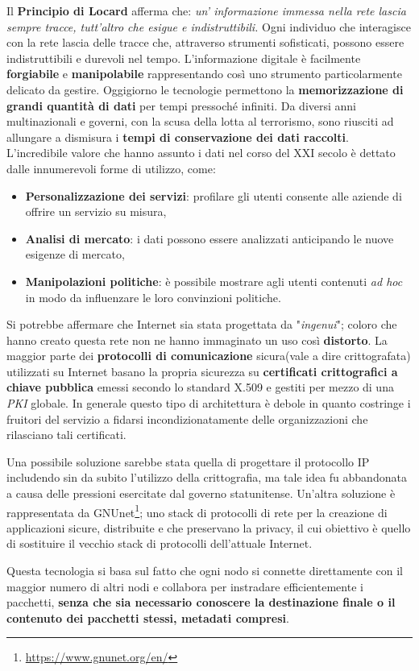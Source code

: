 \bigbreak
Il \textbf{Principio di Locard} afferma che:\emph{ un' informazione immessa nella rete lascia sempre tracce, tutt’altro che esigue e indistruttibili.} Ogni individuo che interagisce con la rete lascia delle tracce che, attraverso strumenti sofisticati, possono essere indistruttibili e durevoli nel tempo. L'informazione digitale è facilmente \textbf{forgiabile} e \textbf{manipolabile} rappresentando così uno strumento particolarmente delicato da gestire. Oggigiorno le tecnologie permettono la \textbf{memorizzazione di grandi quantità di dati} per tempi pressoché infiniti. Da diversi anni multinazionali e governi, con la scusa della lotta al terrorismo, sono riusciti ad allungare a dismisura i \textbf{tempi di conservazione dei dati raccolti}.
\bigbreak
L'incredibile valore che hanno assunto i dati nel corso del XXI secolo è dettato dalle innumerevoli forme di utilizzo, come:
\begin{itemize}
    \item \textbf{Personalizzazione dei servizi}: profilare gli utenti consente alle aziende di offrire un servizio su misura,
    \item \textbf{Analisi di mercato}: i dati possono essere analizzati anticipando le nuove esigenze di mercato,
    \item \textbf{Manipolazioni politiche}: è possibile mostrare agli utenti contenuti \emph{ad hoc} in modo da influenzare le loro convinzioni politiche.
\end{itemize}

\bigbreak
Si potrebbe affermare che Internet sia stata progettata da "\emph{ingenui}"; coloro che hanno creato questa rete non ne hanno immaginato un uso così \textbf{distorto}.
La maggior parte dei \textbf{protocolli di comunicazione} sicura(vale a dire crittografata) utilizzati su Internet basano la propria sicurezza su \textbf{certificati crittografici a chiave pubblica} emessi secondo lo standard X.509 e gestiti per mezzo di una \emph{PKI} globale.
In generale questo tipo di architettura è debole in quanto costringe i fruitori del servizio a fidarsi incondizionatamente delle organizzazioni che rilasciano tali certificati.

Una possibile soluzione sarebbe stata quella di progettare il protocollo IP includendo sin da subito l'utilizzo della crittografia, ma tale idea fu abbandonata a causa delle pressioni esercitate dal governo statunitense.
\bigbreak
Un'altra soluzione è rappresentata da GNUnet\footnote{\url{https://www.gnunet.org/en/}}; uno stack di protocolli di rete per la creazione di applicazioni sicure, distribuite e che preservano la privacy, il cui obiettivo è quello di sostituire il vecchio stack di protocolli dell'attuale Internet.

Questa tecnologia si basa sul fatto che  ogni nodo si connette direttamente con il maggior numero di altri nodi e collabora per instradare efficientemente i pacchetti, \textbf{senza che sia necessario conoscere la destinazione finale o il contenuto dei pacchetti stessi, metadati compresi}.